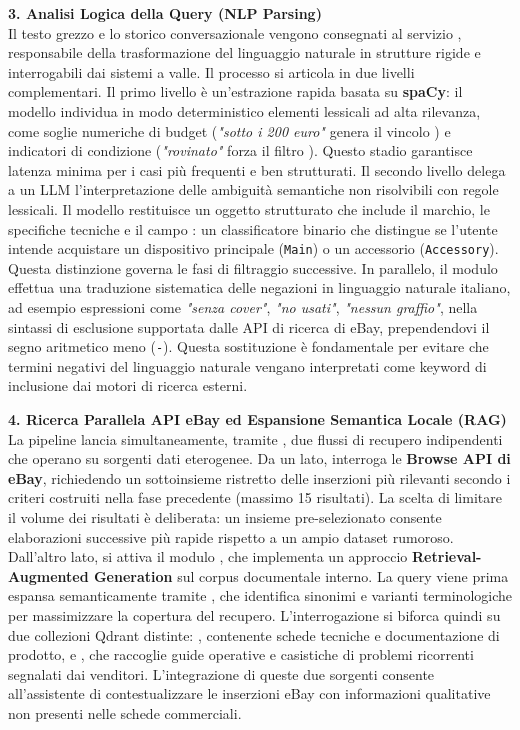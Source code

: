 \vspace{0.4cm}
\noindent
\textbf{3. Analisi Logica della Query (NLP Parsing)}\\
Il testo grezzo e lo storico conversazionale vengono consegnati al servizio
, responsabile della trasformazione del linguaggio
naturale in strutture rigide e interrogabili dai sistemi a valle. Il processo
si articola in due livelli complementari. 
Il primo livello è un'estrazione rapida basata su \textbf{spaCy}: il modello
individua in modo deterministico elementi lessicali ad alta rilevanza, come
soglie numeriche di budget (\emph{"sotto i 200 euro"} genera il vincolo
) e indicatori di condizione (\emph{"rovinato"} forza
il filtro ). Questo stadio garantisce latenza
minima per i casi più frequenti e ben strutturati.
Il secondo livello delega a un LLM l'interpretazione delle
ambiguità semantiche non risolvibili con regole lessicali. Il modello
restituisce un oggetto strutturato che include il marchio, le specifiche
tecniche e il campo : un classificatore binario 
che distingue se l'utente intende acquistare un dispositivo principale (\texttt{Main}) 
o un accessorio (\texttt{Accessory}). Questa distinzione governa le fasi di filtraggio successive.
In parallelo, il modulo  effettua una traduzione
sistematica delle negazioni in linguaggio naturale italiano, ad esempio espressioni
come \emph{"senza cover"}, \emph{"no usati"}, \emph{"nessun graffio"},
nella sintassi di esclusione supportata dalle API di ricerca di eBay,
prependendovi il segno aritmetico meno (\texttt{-}). Questa sostituzione
è fondamentale per evitare che termini negativi del linguaggio naturale
vengano interpretati come keyword di inclusione dai motori di ricerca esterni.

\vspace{0.4cm}
\noindent
\textbf{4. Ricerca Parallela API eBay ed Espansione Semantica Locale (RAG)}\\
La pipeline lancia simultaneamente, tramite , due
flussi di recupero indipendenti che operano su sorgenti dati eterogenee.
Da un lato,  interroga le \textbf{Browse API di eBay},
richiedendo un sottoinsieme ristretto delle inserzioni più
rilevanti secondo i criteri costruiti nella fase precedente (massimo 15 risultati). La scelta
di limitare il volume dei risultati è deliberata: un insieme pre-selezionato 
consente elaborazioni successive più rapide rispetto a un ampio dataset rumoroso.
Dall'altro lato, si attiva il modulo , che implementa un approccio \textbf{Retrieval-Augmented Generation} sul corpus documentale interno. La query viene prima espansa semanticamente tramite , che identifica sinonimi e varianti terminologiche per massimizzare la copertura del recupero. L'interrogazione si biforca quindi su due collezioni Qdrant distinte: , contenente schede tecniche e documentazione di prodotto, e , che raccoglie guide operative e casistiche di problemi ricorrenti segnalati dai venditori. L'integrazione di queste due sorgenti consente all'assistente di contestualizzare le inserzioni eBay con informazioni qualitative non presenti nelle schede commerciali.

